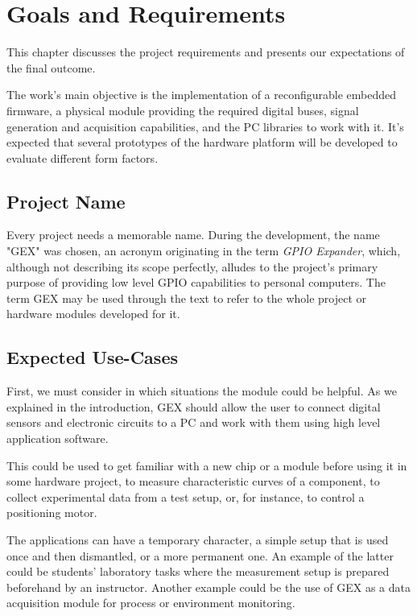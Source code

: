 \chapter{Goals and Requirements}

This chapter discusses the project requirements and presents our expectations of the final outcome.

The work's main objective is the implementation of a reconfigurable embedded firmware, a physical module providing the required digital buses, signal generation and acquisition capabilities, and the PC libraries to work with it. It's expected that several prototypes of the hardware platform will be developed to evaluate different form factors.

\section{Project Name}

Every project needs a memorable name. During the development, the name "GEX" was chosen, an acronym originating in the term \textit{GPIO Expander}, which, although not describing its scope perfectly, alludes to the project's primary purpose of providing low level GPIO capabilities to personal computers. The term GEX may be used through the text to refer to the whole project or hardware modules developed for it.

\section{Expected Use-Cases}

First, we must consider in which situations the module could be helpful. As we explained in the introduction, GEX should allow the user to connect digital sensors and electronic circuits to a PC and work with them using high level application software.

This could be used to get familiar with a new chip or a module before using it in some hardware project, to measure characteristic curves of a component, to collect experimental data from a test setup, or, for instance, to control a positioning motor.

The applications can have a temporary character, a simple setup that is used once and then dismantled, or a more permanent one. An example of the latter could be students' laboratory tasks where the measurement setup is prepared beforehand by an instructor. Another example could be the use of GEX as a data acquisition module for process or environment monitoring.

